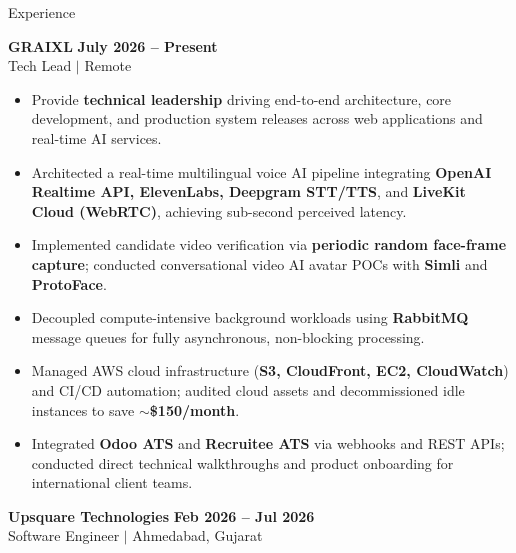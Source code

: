 \documentclass[10pt]{resume}
\begin{document}
\begin{rSection}{Experience}

{\large\textbf{GRAIXL}} \hfill \textbf{July 2026 -- Present}\\[-0.1em]
{\small Tech Lead $|$ Remote}
\begin{itemize}[leftmargin=1.4em, itemsep=-0.38em, topsep=0.12em]
  \item Provide \textbf{technical leadership} driving end-to-end architecture, core development, and production system releases across web applications and real-time AI services.
  \item Architected a real-time multilingual voice AI pipeline integrating \textbf{OpenAI Realtime API, ElevenLabs, Deepgram STT/TTS}, and \textbf{LiveKit Cloud (WebRTC)}, achieving sub-second perceived latency.
  \item Implemented candidate video verification via \textbf{periodic random face-frame capture}; conducted conversational video AI avatar POCs with \textbf{Simli} and \textbf{ProtoFace}.
  \item Decoupled compute-intensive background workloads using \textbf{RabbitMQ} message queues for fully asynchronous, non-blocking processing.
  \item Managed AWS cloud infrastructure (\textbf{S3, CloudFront, EC2, CloudWatch}) and CI/CD automation; audited cloud assets and decommissioned idle instances to save \textbf{$\sim$\$150/month}.
  \item Integrated \textbf{Odoo ATS} and \textbf{Recruitee ATS} via webhooks and REST APIs; conducted direct technical walkthroughs and product onboarding for international client teams.
\end{itemize}

\vspace{0.08em}

{\large\textbf{Upsquare Technologies}} \hfill \textbf{Feb 2026 -- Jul 2026}\\[-0.1em]
{\small Software Engineer $|$ Ahmedabad, Gujarat}


\end{rSection}
\end{document}
